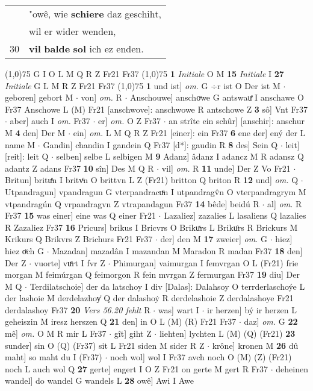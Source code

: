 \documentclass[8pt,a4paper,notitlepage]{article}
\begin{document}
\begin{table}[ht]
\begin{minipage}[t]{0.5\linewidth}
\begin{tabular}{rl}
 & "owê, wie \textbf{schiere} daz geschiht,\\ 
 & wil er wider wenden,\\ 
30 & \textbf{vil} \textbf{balde} \textbf{sol} ich ez enden.\\ 
\end{tabular}
\scriptsize
\line(1,0){75} \newline
G I O L M Q R Z Fr21 Fr37 \newline
\line(1,0){75} \newline
\textbf{1} \textit{Initiale} O M  \textbf{15} \textit{Initiale} I  \textbf{27} \textit{Initiale} G L M R Z Fr21 Fr37  \newline
\line(1,0){75} \newline
\textbf{1} und ist] \textit{om.} G ÷r ist O Der ist M  $\cdot$ geboren] gebort M  $\cdot$ von] \textit{om.} R  $\cdot$ Anschouwe] anschoͮwe G antswauͤ I anschawe O Fr37 Anschowe L (M) Fr21 [anschwove]: anschwowe R antschowe Z \textbf{3} sô] Vnt Fr37  $\cdot$ aber] auch I \textit{om.} Fr37  $\cdot$ er] \textit{om.} O Z Fr37  $\cdot$ an strîte ein schûr] [anschir]: anschur M \textbf{4} den] Der M  $\cdot$ ein] \textit{om.} L M Q R Z Fr21 [einer]: ein Fr37 \textbf{6} ene der] ený der L name M  $\cdot$ Gandin] chandin I gandein Q Fr37 [d*]: gaudin R \textbf{8} des] Sein Q  $\cdot$ leit] [reit]: leit Q  $\cdot$ selben] selbe L selbigen M \textbf{9} Adanz] âdanz I adancz M R adansz Q adantz Z adans Fr37 \textbf{10} sîn] Des M Q R  $\cdot$ vil] \textit{om.} R \textbf{11} unde] Der Z Vo Fr21  $\cdot$ Britun] brituͤn I britvͦn O brittvn L Z (Fr21) britton Q briton R \textbf{12} und] \textit{om.} Q  $\cdot$ Utpandragun] vpandragun G vterpandracuͤn I utpandragv̂n O vterpandragrym M vtpandragún Q vrpandragvn Z vtrapandagun Fr37 \textbf{14} bêde] beidú R  $\cdot$ al] \textit{om.} R Fr37 \textbf{15} was einer] eine was Q einer Fr21  $\cdot$ Lazaliez] zazalies L lasaliens Q lazalies R Zazaliez Fr37 \textbf{16} Pricurs] brikus I Bricvrs O Brikuͯrs L Brikuͦrs R Brickurs M Krikurs Q Brikvrs Z Brichurs Fr21 Fr37  $\cdot$ der] den M \textbf{17} zweier] \textit{om.} G  $\cdot$ hiez] hiez oͮch G  $\cdot$ Mazadan] mazadân I mazandan M Maradon R madan Fr37 \textbf{18} den] Der Z  $\cdot$ vuorte] vuͤrt I fvr Z  $\cdot$ Phimurgan] vaimurgan I femvrgan O L (Fr21) frie morgan M feimúrgan Q feimorgon R fein mvrgan Z fermurgan Fr37 \textbf{19} diu] Der M Q  $\cdot$ Terdilatschoie] der da latschoy I div [Dalas]: Dalahsoy O terrderlaschoýe L der lashoie M derdelazhoy͑ Q der dalashoẏ R derdelashoie Z derdalashoye Fr21 derdalashoy Fr37 \textbf{20} \textit{Vers 56.20 fehlt} R   $\cdot$ was] wart I  $\cdot$ ir herzen] bý ir herzen L geheiszin M iresz herszen Q \textbf{21} den] in O L (M) (R) Fr21 Fr37  $\cdot$ daz] \textit{om.} G \textbf{22} mê] \textit{om.} O M R mir L Fr37  $\cdot$ gît] giht Z  $\cdot$ liehten] lychten L (M) (Q) (Fr21) \textbf{23} sunder] sin O (Q) (Fr37) sit L Fr21 siden M sider R Z  $\cdot$ krône] kronen M \textbf{26} dû maht] so maht du I (Fr37)  $\cdot$ noch wol] wol I Fr37 avch noch O (M) (Z) (Fr21) noch L auch wol Q \textbf{27} gerte] engert I O Z Fr21 on gerte M gert R Fr37  $\cdot$ deheinen wandel] do wandel G wandels L \textbf{28} owê] Awi I Awe 
\end{minipage}
\end{table}
\end{document}
